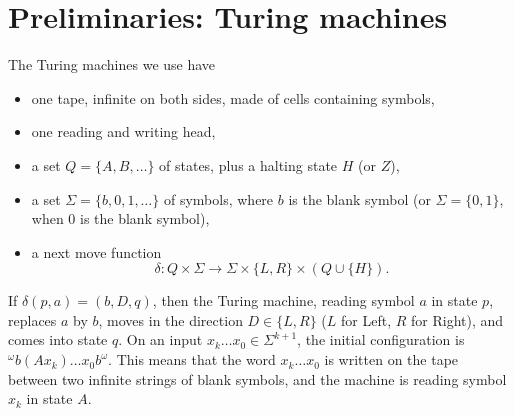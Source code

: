 \documentclass[10pt]{article}
\begin{document}
\section{Preliminaries: Turing machines}
The Turing machines we use have
\begin{itemize}
\item one tape, infinite on both sides, made of cells containing symbols,
\item one reading and writing head,
\item a set $Q = \{A, B, \ldots\}$ of states, plus a halting state $H$ (or $Z$),
\item a set $\Sigma = \{b,0,1,\ldots\}$ of symbols, where $b$ is the blank symbol
(or $\Sigma = \{0,1\}$, when 0 is the blank symbol),
\item a next move function
$$\delta : Q \times \Sigma \rightarrow \Sigma \times \{L, R\} \times(Q \cup\{H\}).$$
\end{itemize}
If $\delta(p,a) = (b,D,q)$, then the Turing machine, reading symbol $a$ in state $p$,
replaces $a$ by $b$, moves in the direction $D \in \{L, R\}$ ($L$ for Left, 
$R$ for Right), and comes into state $q$.
On an input $x_k\ldots x_0 \in \Sigma^{k+1}$, the initial configuration is
$^\omega b(Ax_k)\ldots x_0b^\omega$. This means that the word $x_k\ldots x_0$ is written
on the tape between two infinite strings of blank symbols, and the machine is reading
symbol $x_k$ in state $A$.
\end{document}
